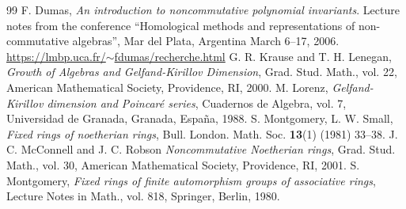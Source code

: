 \documentclass[10pt,a4paper]{amsart}
\begin{document}
\begin{thebibliography}{99}
 {\sc F. Dumas}, {\em An introduction to noncommutative polynomial invariants}. Lecture notes from the conference ``Homological methods and representations of non-commutative algebras'', Mar del Plata, Argentina March 6--17, 2006.\\ \href{https://lmbp.uca.fr/$\sim$fdumas/recherche.html}{https://lmbp.uca.fr/$\sim$fdumas/recherche.html}
 {\sc G. R. Krause and T. H. Lenegan}, {\em Growth of Algebras and Gelfand-Kirillov Dimension}, Grad. Stud. Math., vol. 22, American Mathematical Society, Providence, RI, 2000.%
 {\sc M. Lorenz}, {\em Gelfand-Kirillov dimension and Poincaré series}, Cuadernos de Algebra, vol. 7, Universidad de Granada, Granada, España, 1988. %
 {\sc S. Montgomery, L. W. Small}, {\em Fixed rings of noetherian rings}, Bull. London. Math. Soc. {\bf 13}(1) (1981) 33--38.%
 {\sc J. C. McConnell and J. C. Robson} {\em Noncommutative Noetherian rings}, Grad. Stud. Math., vol. 30, American Mathematical Society, Providence, RI, 2001.%
 {\sc S. Montgomery}, {\em Fixed rings of finite automorphism groups of associative rings}, Lecture Notes in Math., vol. 818, Springer, Berlin, 1980.%
\end{thebibliography}
\end{document}
